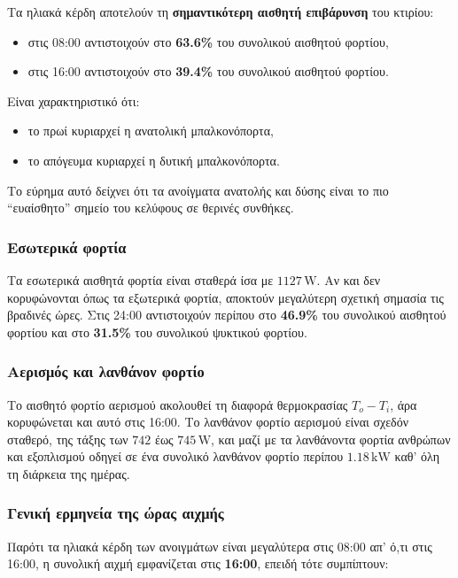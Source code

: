 \documentclass[12pt,a4paper]{article}
\begin{document}
Τα ηλιακά κέρδη αποτελούν τη \textbf{σημαντικότερη αισθητή επιβάρυνση} του κτιρίου:

\begin{itemize}
\item στις 08:00 αντιστοιχούν στο \textbf{63.6\%} του συνολικού αισθητού φορτίου,
\item στις 16:00 αντιστοιχούν στο \textbf{39.4\%} του συνολικού αισθητού φορτίου.
\end{itemize}

Είναι χαρακτηριστικό ότι:

\begin{itemize}
\item το πρωί κυριαρχεί η ανατολική μπαλκονόπορτα,
\item το απόγευμα κυριαρχεί η δυτική μπαλκονόπορτα.
\end{itemize}

Το εύρημα αυτό δείχνει ότι τα ανοίγματα ανατολής και δύσης είναι το πιο ``ευαίσθητο''
σημείο του κελύφους σε θερινές συνθήκες.

\subsubsection{Εσωτερικά φορτία}

Τα εσωτερικά αισθητά φορτία είναι σταθερά ίσα με \(1127\,\mathrm{W}\). Αν και δεν
κορυφώνονται όπως τα εξωτερικά φορτία, αποκτούν μεγαλύτερη σχετική σημασία τις
βραδινές ώρες. Στις 24:00 αντιστοιχούν περίπου στο \textbf{46.9\%} του συνολικού
αισθητού φορτίου και στο \textbf{31.5\%} του συνολικού ψυκτικού φορτίου.

\subsubsection{Αερισμός και λανθάνον φορτίο}

Το αισθητό φορτίο αερισμού ακολουθεί τη διαφορά θερμοκρασίας \(T_o - T_i\), άρα
κορυφώνεται και αυτό στις 16:00. Το λανθάνον φορτίο αερισμού είναι σχεδόν σταθερό,
της τάξης των \(742\) έως \(745\,\mathrm{W}\), και μαζί με τα λανθάνοντα φορτία
ανθρώπων και εξοπλισμού οδηγεί σε ένα συνολικό λανθάνον φορτίο περίπου
\(1.18\,\mathrm{kW}\) καθ' όλη τη διάρκεια της ημέρας.

\subsubsection{Γενική ερμηνεία της ώρας αιχμής}

Παρότι τα ηλιακά κέρδη των ανοιγμάτων είναι μεγαλύτερα στις 08:00 απ' ό,τι στις 16:00,
η συνολική αιχμή εμφανίζεται στις \textbf{16:00}, επειδή τότε συμπίπτουν:
\end{document}
